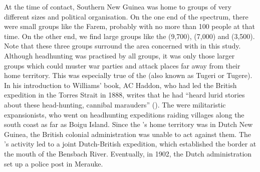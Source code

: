 At the time of contact, Southern New Guinea was home to groups of very different sizes and political organisation. On the one end of the spectrum, there were small groups like the Farem, probably with no more than 100 people at that time. On the other end, we find large groups like the  (9,700),  (7,000) and  (3,500). Note that these three groups surround the area concerned with in this study. Although headhunting was practised by all groups, it was only those larger groups which could muster war parties and attack places far away from their home territory. This was especially true of the  (also known as Tugeri or Tugere). In his introduction to Williams' book, AC Haddon, who had led the British expedition in the Torres Strait in 1888, writes that he had ``heard lurid stories about these head-hunting, cannibal marauders'' (\citeyear[xxiiv]{Williams:1936transfly}). The  were militaristic expansionists, who went on headhunting expeditions raiding villages along the south coast as far as Boigu Island. Since the 's home territory was in Dutch New Guinea, the British colonial administration was unable to act against them. The 's activity led to a joint Dutch-British expedition, which established the border at the mouth of the Bensbach River. Eventually, in 1902, the Dutch administration set up a police post in Merauke.

